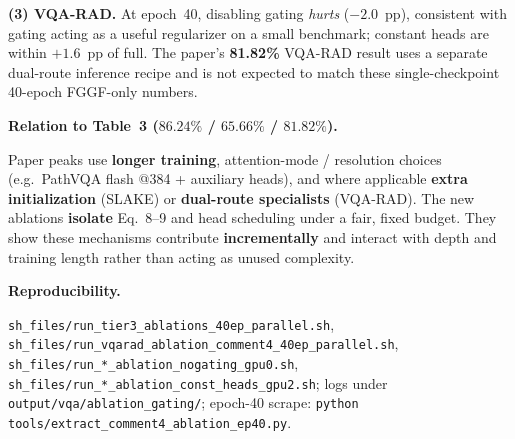 \textbf{(3) VQA-RAD.} At epoch~40, disabling gating \emph{hurts} ($-2.0$~pp),
consistent with gating acting as a useful regularizer on a small benchmark;
constant heads are within $+1.6$~pp of full. The paper’s \textbf{81.82\%}
VQA-RAD result uses a separate dual-route inference recipe and is not expected
to match these single-checkpoint 40-epoch FGGF-only numbers.

\medskip
\noindent\textbf{Relation to Table~3 ($86.24\%$ / $65.66\%$ / $81.82\%$).}

Paper peaks use \textbf{longer training}, attention-mode / resolution choices
(e.g.\ PathVQA flash @384 + auxiliary heads), and where applicable
\textbf{extra initialization} (SLAKE) or \textbf{dual-route specialists}
(VQA-RAD). The new ablations \textbf{isolate} Eq.~8--9 and head scheduling
under a fair, fixed budget. They show these mechanisms contribute
\textbf{incrementally} and interact with depth and training length rather than
acting as unused complexity.

\medskip
\noindent\textbf{Reproducibility.}

\texttt{sh\_files/run\_tier3\_ablations\_40ep\_parallel.sh},
\texttt{sh\_files/run\_vqarad\_ablation\_comment4\_40ep\_parallel.sh},
\texttt{sh\_files/run\_*\_ablation\_nogating\_gpu0.sh},
\texttt{sh\_files/run\_*\_ablation\_const\_heads\_gpu2.sh};
logs under \texttt{output/vqa/ablation\_gating/};
epoch-40 scrape: \texttt{python tools/extract\_comment4\_ablation\_ep40.py}.
